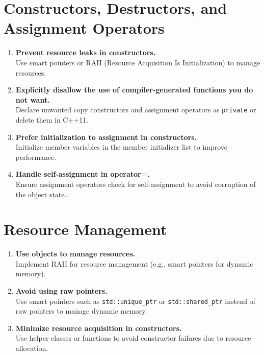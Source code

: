 \section{Constructors, Destructors, and Assignment Operators}
\begin{enumerate}
    \item \textbf{Prevent resource leaks in constructors.} \\
    Use smart pointers or RAII (Resource Acquisition Is Initialization) to manage resources.
    
    \item \textbf{Explicitly disallow the use of compiler-generated functions you do not want.} \\
    Declare unwanted copy constructors and assignment operators as \texttt{private} or delete them in C++11.

    \item \textbf{Prefer initialization to assignment in constructors.} \\
    Initialize member variables in the member initializer list to improve performance.

    \item \textbf{Handle self-assignment in operator=.} \\
    Ensure assignment operators check for self-assignment to avoid corruption of the object state.
\end{enumerate}

\section{Resource Management}
\begin{enumerate}
    \item \textbf{Use objects to manage resources.} \\
    Implement RAII for resource management (e.g., smart pointers for dynamic memory).

    \item \textbf{Avoid using raw pointers.} \\
    Use smart pointers such as \texttt{std::unique\_ptr} or \texttt{std::shared\_ptr} instead of raw pointers to manage dynamic memory.

    \item \textbf{Minimize resource acquisition in constructors.} \\
    Use helper classes or functions to avoid constructor failures due to resource allocation.

\end{enumerate}

